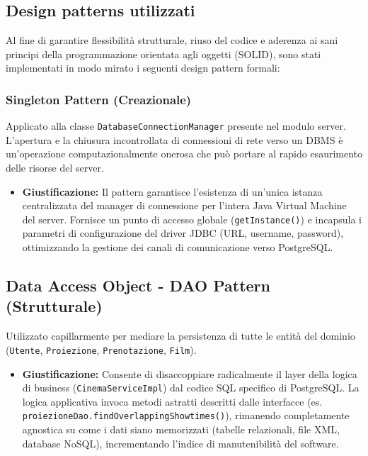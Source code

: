 \documentclass{article}
\begin{document}
\subsection{Design patterns utilizzati}
Al fine di garantire flessibilità strutturale, riuso del codice e aderenza ai sani principi della programmazione orientata agli oggetti (SOLID), sono stati implementati in modo mirato i seguenti design pattern formali:

\subsubsection{Singleton Pattern (Creazionale)}
Applicato alla classe \texttt{DatabaseConnectionManager} presente nel modulo server. L'apertura e la chiusura incontrollata di connessioni di rete verso un DBMS è un'operazione computazionalmente onerosa che può portare al rapido esaurimento delle risorse del server.
\begin{itemize}
    \item \textbf{Giustificazione:} Il pattern garantisce l'esistenza di un'unica istanza centralizzata del manager di connessione per l'intera Java Virtual Machine del server. Fornisce un punto di accesso globale (\texttt{getInstance()}) e incapsula i parametri di configurazione del driver JDBC (URL, username, password), ottimizzando la gestione dei canali di comunicazione verso PostgreSQL.
\end{itemize}

\subsection{Data Access Object - DAO Pattern (Strutturale)}
Utilizzato capillarmente per mediare la persistenza di tutte le entità del dominio (\texttt{Utente}, \texttt{Proiezione}, \texttt{Prenotazione}, \texttt{Film}). 
\begin{itemize}
    \item \textbf{Giustificazione:} Consente di disaccoppiare radicalmente il layer della logica di business (\texttt{CinemaServiceImpl}) dal codice SQL specifico di PostgreSQL. La logica applicativa invoca metodi astratti descritti dalle interfacce (es. \texttt{proiezioneDao.findOverlappingShowtimes()}), rimanendo completamente agnostica su come i dati siano memorizzati (tabelle relazionali, file XML, database NoSQL), incrementando l'indice di manutenibilità del software.
\end{itemize}
\end{document}
